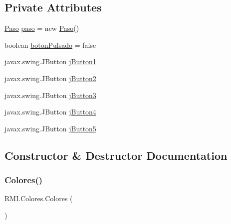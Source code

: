 \subsection*{Private Attributes}
\begin{DoxyCompactItemize}
\item 
\mbox{\hyperlink{class_r_m_i_1_1_paso}{Paso}} \mbox{\hyperlink{class_r_m_i_1_1_colores_aad069517f2f10a0e1a58d42eac79bb76}{paso}} = new \mbox{\hyperlink{class_r_m_i_1_1_paso}{Paso}}()
\item 
boolean \mbox{\hyperlink{class_r_m_i_1_1_colores_af81a5077f5960e712338fe4962eadfe2}{boton\+Pulsado}} = false
\item 
javax.\+swing.\+J\+Button \mbox{\hyperlink{class_r_m_i_1_1_colores_add77873c88866ea978fcad21ad2eda75}{j\+Button1}}
\item 
javax.\+swing.\+J\+Button \mbox{\hyperlink{class_r_m_i_1_1_colores_ad8deec15488def53e7a4e617ae4253ad}{j\+Button2}}
\item 
javax.\+swing.\+J\+Button \mbox{\hyperlink{class_r_m_i_1_1_colores_a2ca1cf1514d7f93a94808c3c4d8f19e7}{j\+Button3}}
\item 
javax.\+swing.\+J\+Button \mbox{\hyperlink{class_r_m_i_1_1_colores_a07351e661898a4b3c4a1b0abae7fcbb5}{j\+Button4}}
\item 
javax.\+swing.\+J\+Button \mbox{\hyperlink{class_r_m_i_1_1_colores_a20b401d6acdf13f51e984d95c4697d90}{j\+Button5}}
\end{DoxyCompactItemize}


\subsection{Constructor \& Destructor Documentation}
\mbox{\label{class_r_m_i_1_1_colores_a9d1a322e10d3c217309e02017973b5f0}} 
\subsubsection{\texorpdfstring{Colores()}{Colores()}}
{\footnotesize\ttfamily R\+M\+I.\+Colores.\+Colores (\begin{DoxyParamCaption}{ }\end{DoxyParamCaption})\hspace{0.3cm}{\ttfamily [inline]}}

